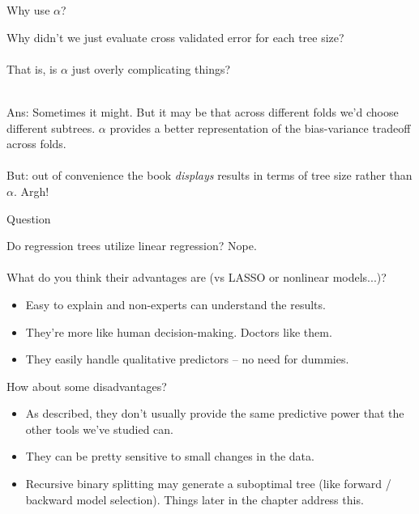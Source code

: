 \documentclass[mathserif, aspectratio=169]{beamer}
\begin{document}
\begin{frame}{Why use $\alpha$?}

Why didn't we just evaluate cross validated error for each tree size?\\~\\

That is, is $\alpha$ just overly complicating things?\\~\\

\pause

Ans: Sometimes it might.  But it may be that across different folds we'd choose different subtrees.  $\alpha$ provides a better representation of the bias-variance tradeoff across folds.  \\~\\

But: out of convenience the book \textit{displays} results in terms of tree size rather than $\alpha$.  Argh!

\end{frame}


\begin{frame}{Question}

Do regression trees utilize linear regression? \pause Nope.  \\~\\

What do you think their advantages are (vs LASSO or nonlinear models...)? \pause

\begin{itemize}
\item Easy to explain and non-experts can understand the results.
\item They're more like human decision-making.  Doctors like them.
\item They easily handle qualitative predictors -- no need for dummies.
\end{itemize}

\pause How about some disadvantages? \pause

\begin{itemize}
\item As described, they don't usually provide the same predictive power that the other tools we've studied can.
\item They can be pretty sensitive to small changes in the data. 
\item Recursive binary splitting may generate a suboptimal tree (like forward / backward model selection).  Things later in the chapter address this.
\end{itemize}
\end{frame}
\end{document}
